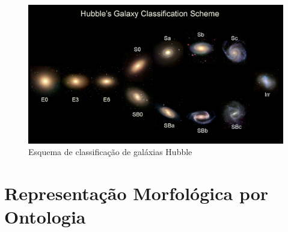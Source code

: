 \begin{figure}[!h]
  \centering
  \caption{Esquema de classificação de galáxias Hubble}
  \label{fig:hubble-sequence}
  \includegraphics[width=\linewidth,trim={0 20mm 10mm 65mm},clip]{figures/hubble_sequence.png}
\end{figure}









\section{Representação Morfológica por Ontologia}
\label{sec:ontologia}

\lipsum[1-2]









